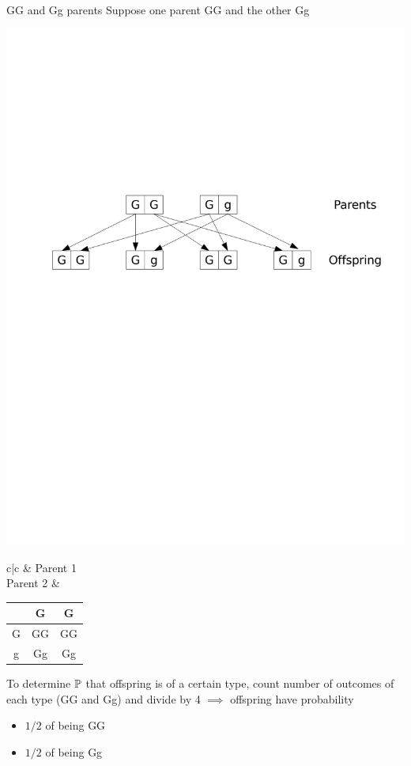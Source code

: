 \documentclass[aspectratio=169]{beamer}
\begin{document}
\begin{frame}{GG and Gg parents}
Suppose one parent GG and the other Gg
\vfill
\begin{center}
	\includegraphics[width=\textwidth]{FIGS_slides/dominant_hybrid}
\end{center}
\begin{center}
\begin{tabular}{c|c}
& Parent 1 \\ 
\hline
Parent 2 &
\begin{tabular}{c|cc}
& G & G \\
\hline
G & GG & GG \\
g & Gg & Gg
\end{tabular}
\end{tabular}
\end{center}
To determine $\mathbb{P}$ that offspring is of a certain type, count number of outcomes of each type (GG and Gg) and divide by 4
\vfill
$\implies$ offspring have probability
\begin{itemize}
\item $1/2$ of being GG
\item $1/2$ of being Gg
\end{itemize}
\end{frame}
\end{document}
